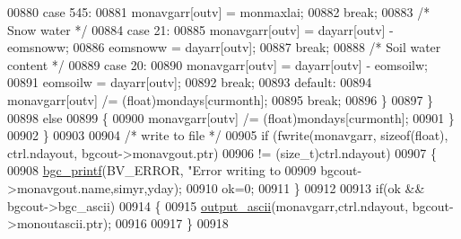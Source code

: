 \begin{DoxyCode}
{{{{{{{{{{{{{{{{{{{{{{{{{{{{{{{{{{{{{{{{{00880                                 \textcolor{keywordflow}{case} 545:
00881                                     monavgarr[outv] = monmaxlai; 
00882                                     \textcolor{keywordflow}{break};
00883                                 \textcolor{comment}{/* Snow water */}
00884                                 \textcolor{keywordflow}{case} 21:
00885                                     monavgarr[outv] = dayarr[outv] - eomsnoww; 
00886                                     eomsnoww = dayarr[outv]; 
00887                                     \textcolor{keywordflow}{break};
00888                                 \textcolor{comment}{/* Soil water content */}
00889                                 \textcolor{keywordflow}{case} 20:
00890                                     monavgarr[outv] = dayarr[outv] - eomsoilw;
00891                                     eomsoilw = dayarr[outv];
00892                                     \textcolor{keywordflow}{break};
00893                                 \textcolor{keywordflow}{default}:
00894                                     monavgarr[outv] /= (float)mondays[curmonth];
00895                                     \textcolor{keywordflow}{break};
00896                             \}
00897                         \}
00898                         \textcolor{keywordflow}{else} 
00899                         \{
00900                             monavgarr[outv] /= (float)mondays[curmonth];
00901                         \}
00902                     \}
00903                     
00904                     \textcolor{comment}{/* write to file */}
00905                     \textcolor{keywordflow}{if} (fwrite(monavgarr, \textcolor{keyword}{sizeof}(\textcolor{keywordtype}{float}), ctrl.ndayout, bgcout->monavgout.ptr)
00906                         != (\textcolor{keywordtype}{size\_t})ctrl.ndayout)
00907                     \{
00908                         \hyperlink{bgc__io_8c_af287cce6e2aede1ce337de9319e80d0d}{bgc\_printf}(BV\_ERROR, \textcolor{stringliteral}{"Error writing to %
00909                             bgcout->monavgout.name,simyr,yday);
00910                         ok=0;
00911                     \}
00912                     
00913                     \textcolor{keywordflow}{if}(ok && bgcout->bgc\_ascii)
00914                     \{
00915                         \hyperlink{output__ascii_8c_a2d026e2a6b7b7727a322ea7e0d43bec7}{output\_ascii}(monavgarr,ctrl.ndayout, bgcout->monoutascii.ptr);
00916                         
00917                     \}
00918                     
}}}}}}}}}}}}}}}}}}}}}}}}}}}}}}}}}}}}}}}}}}
\end{DoxyCode}
